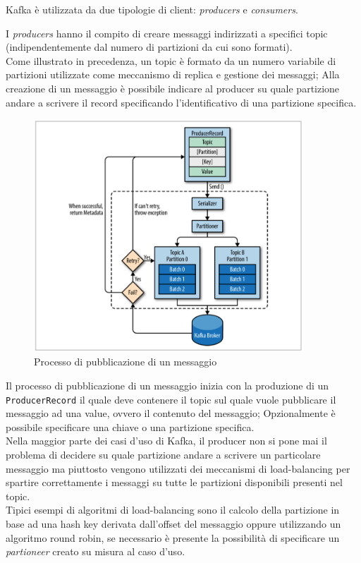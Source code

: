 \documentclass[]{article}
\begin{document}
Kafka è utilizzata da due tipologie di client: \emph{producers} e
\emph{consumers}.

I \emph{producers} hanno il compito di creare messaggi indirizzati a
specifici topic (indipendentemente dal numero di partizioni da cui sono
formati).\\
Come illustrato in precedenza, un topic è formato da un numero variabile
di partizioni utilizzate come meccanismo di replica e gestione dei
messaggi; Alla creazione di un messaggio è possibile indicare al
producer su quale partizione andare a scrivere il record specificando
l'identificativo di una partizione specifica.

\begin{figure}
\centering
\includegraphics[width=0.90000\textwidth]{../images/producer-process.png}
\caption{Processo di pubblicazione di un messaggio \label{figure_3}}
\end{figure}

Il processo di pubblicazione di un messaggio inizia con la produzione di
un \texttt{ProducerRecord} il quale deve contenere il topic sul quale
vuole pubblicare il messaggio ad una value, ovvero il contenuto del
messaggio; Opzionalmente è possibile specificare una chiave o una
partizione specifica.\\
Nella maggior parte dei casi d'uso di Kafka, il producer non si pone mai
il problema di decidere su quale partizione andare a scrivere un
particolare messaggio ma piuttosto vengono utilizzati dei meccanismi di
load-balancing per spartire correttamente i messaggi su tutte le
partizioni disponibili presenti nel topic.\\
Tipici esempi di algoritmi di load-balancing sono il calcolo della
partizione in base ad una hash key derivata dall'offset del messaggio
oppure utilizzando un algoritmo round robin, se necessario è presente la
possibilità di specificare un \emph{partioneer} creato su misura al caso
d'uso.
\end{document}

